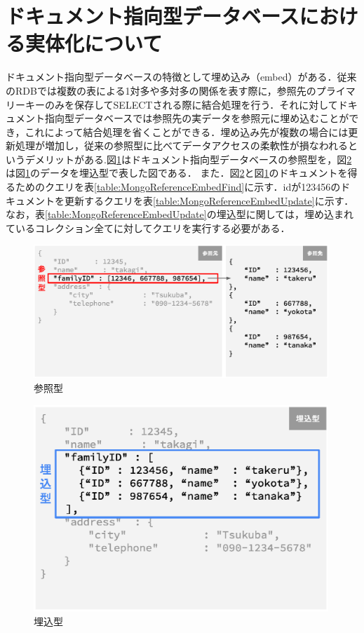 \documentclass[a4paper,11pt]{ujreport}
\begin{document}
\section{ドキュメント指向型データベースにおける実体化について}
ドキュメント指向型データベースの特徴として埋め込み（embed）がある．従来のRDBでは複数の表による1対多や多対多の関係を表す際に，参照先のプライマリーキーのみを保存してSELECTされる際に結合処理を行う．それに対してドキュメント指向型データベースでは参照先の実データを参照元に埋め込むことができ，これによって結合処理を省くことができる．埋め込み先が複数の場合には更新処理が増加し，従来の参照型に比べてデータアクセスの柔軟性が損なわれるというデメリットがある\cite{Sky株式会社201212}.図\ref{figure:Reference}はドキュメント指向型データベースの参照型を，図\ref{figure:Embed}は図\ref{figure:Reference}のデータを埋込型で表した図である．
また．図\ref{figure:Embed}と図\ref{figure:Reference}のドキュメントを得るためのクエリを表\ref{table:MongoReferenceEmbedFind}に示す．idが123456のドキュメントを更新するクエリを表\ref{table:MongoReferenceEmbedUpdate}に示す．なお，表\ref{table:MongoReferenceEmbedUpdate}の埋込型に関しては，埋め込まれているコレクション全てに対してクエリを実行する必要がある．
\begin{figure}[htbp]
	\begin{center}
		\includegraphics[width=30em, trim=0 5em 0 2em]{src/Reference.eps} %
	\end{center}
	\caption{参照型}
	\label{figure:Reference}
\end{figure}
\begin{figure}[htbp]
	\begin{center}
		\includegraphics[width=30em, trim=0 7em 0 0em]{src/Embed.eps} %
	\end{center}
	\caption{埋込型}
	\label{figure:Embed}
\end{figure}
\end{document}
